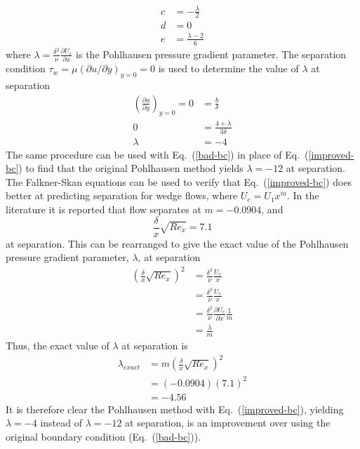 \documentclass[a4paper]{article}
\newcommand{\eref}[1]{Eq.~(\ref{#1})}
\newcommand{\pd}[2]{\frac{\partial #1}{\partial #2}}
\begin{document}
\begin{enumerate}
\begin{align}
      c &= -\frac{\lambda}{2} \\
      d &= 0 \\
      e &= \frac{\lambda - 2}{6}
      \label{coefs}
    \end{align}
    where $\lambda = \frac{\delta^2}{\nu}\pd{U_e}{x}$ is the Pohlhausen pressure
    gradient parameter.  The separation condition $\tau_w = \mu(\partial
    u/\partial y)_{y=0} = 0$ is used to determine the value of $\lambda$ at
    separation
    \begin{equation}
      \begin{aligned}
        \left( \pd{u}{y} \right)_{y=0} = 0 &= \frac{b}{\delta} \\
        0 &= \frac{4+\lambda}{3\delta} \\
        \lambda &= -4
      \end{aligned}
      \label{new-separation-point}
    \end{equation}
    The same procedure can be used with \eref{bad-bc} in place of
    \eref{improved-bc} to find that the original Pohlhausen method yields
    $\lambda = -12$ at separation.  The Falkner-Skan equations can be used to
    verify that \eref{improved-bc} does better at predicting separation for
    wedge flows, where $U_e = U_1 x^m$.  In the literature\cite{Shetz} it is
    reported that
    flow separates at $m = -0.0904$, and
    \begin{equation}
      \frac{\delta}{x}\sqrt{Re_x} = 7.1
      \label{bl-falkner-skan}
    \end{equation}
    at separation. This can be rearranged to give the exact value of the
    Pohlhausen pressure gradient parameter, $\lambda$, at separation
    \begin{equation}
      \begin{aligned}
        \left( \frac{\delta}{x}\sqrt{Re_x}\right)^2 &= \frac{\delta^2}{\nu}\frac{U_e}{x} \\
        &= \frac{\delta^2}{\nu}\frac{U_e}{x} \\
        &= \frac{\delta^2}{\nu}\pd{U_e}{x}\frac{1}{m} \\
        &= \frac{\lambda}{m}
      \end{aligned}
      \label{exact-lambda}
    \end{equation}
    Thus, the exact value of $\lambda$ at separation is
    \begin{equation}
      \begin{aligned}
        \lambda_{exact} &= m \left(\frac{\delta}{x}\sqrt{Re_x}\right)^2 \\
        &= (-0.0904)(7.1)^2 \\
        &= -4.56
      \end{aligned}
      \label{exact-lambda-value}
    \end{equation}
    It is therefore clear the Pohlhausen method with \eref{improved-bc},
    yielding $\lambda = -4$ instead of $\lambda = -12$ at separation, is an
    improvement over using the original boundary condition (\eref{bad-bc}).


\end{enumerate}
\end{document}

